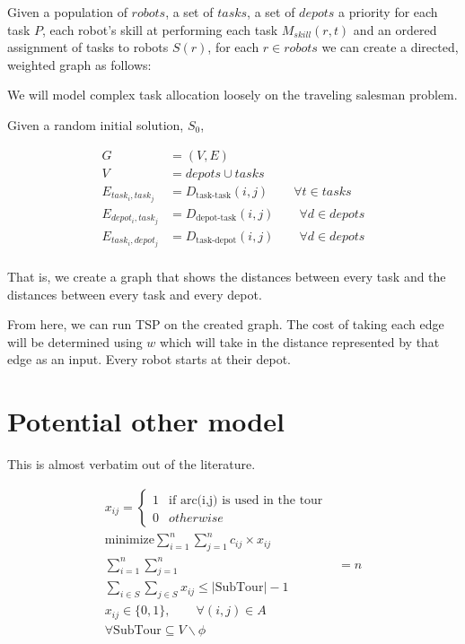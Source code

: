 \documentclass[a4paper]{article}
\begin{document}
Given a population of $\mathit{robots}$, a set of $\mathit{tasks}$, a set of $\mathit{depots}$ a priority for each task $P$, each robot's skill at performing each task $M_{skill}(r,t)$ and an ordered assignment of tasks to robots $S(r)$, for each $r \in \mathit{robots}$
we can create a directed, weighted graph as follows:

We will model complex task allocation loosely on the traveling salesman problem.

Given a random initial solution, $S_0$,

\begin{align*}
	G &= (V, E) \\
	V &= \mathit{depots} \cup \mathit{tasks} \\
	E_{task_i, task_j} &= D_\text{task-task}(i,j) \qquad \forall t \in \mathit{tasks} \\
  E_{depot_i, task_j} &= D_\text{depot-task}(i,j) \qquad \forall d \in \mathit{depots}\\
	E_{task_i, depot_j} &= D_\text{task-depot}(i,j) \qquad \forall d \in \mathit{depots}\\
\end{align*}
%

That is, we create a graph that shows the distances between every task and the distances between every task and every depot.

From here, we can run TSP on the created graph. The cost of taking each edge will be determined using $w$ which will take in the distance represented by that edge as an input. Every robot starts at their depot.

\section{Potential other model}

This is almost verbatim out of the literature.

\begin{align}
x_{ij} = \begin{cases}
      1 & \text{if arc(i,j) is used in the tour} \\
      0 & otherwise
   \end{cases} \\
\text{minimize} \sum_{i=1}^n \sum_{j=1}^n c_{ij} \times x_{ij} \\
\sum_{i=1}^n \sum_{j=1}^n &= n \\
\sum_{i \in S} \sum_{j \in S} x_{ij} \le |\text{SubTour}| - 1 \\
x_{ij} \in \{0, 1\},\qquad \forall (i, j) \in A \\
\forall \text{SubTour} \subseteq V \backslash \phi
\end{align}
\end{document}
